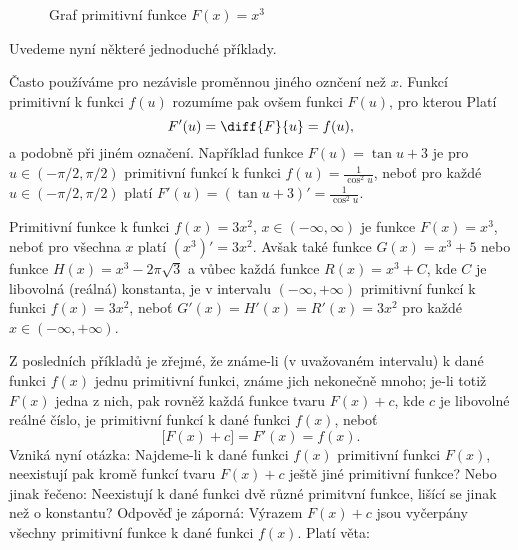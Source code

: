     \begin{figure}[ht!]
      \centering
      \caption{Graf primitivní funkce \(F(x) = x^3\)}
      \label{mai:fig099}
    \end{figure}

    Uvedeme nyní některé jednoduché příklady.
    

    Často používáme pro nezávisle proměnnou jiného oznčení než \(x\). Funkcí primitivní k funkci
    \(f(u)\) rozumíme pak ovšem funkci \(F(u)\), pro kterou Platí
    \begin{equation*}
      F'(u) = \diff{F}{u} = f(u),
    \end{equation*}
    a podobně při jiném označení. Například funkce \(F(u) = \tan u + 3\) je pro \(u\in(-\pi/2,
    \pi/2)\) primitivní funkcí k funkci \(f(u)=\frac{1}{\cos^2u}\), neboť pro každé \(u\in(-\pi/2,
    \pi/2)\) platí \(F'(u)=(\tan u + 3)' = \frac{1}{\cos^2u}\).

    Primitivní funkce k funkci \(f(x)=3x^2\), \(x\in(-\infty, \infty)\) je funkce \(F(x)=x^3\),
    neboť pro všechna \(x\) platí \((x^3)'=3x^2\). Avšak také funkce \(G(x) = x^3+5\) nebo funkce
    \(H(x)=x^3-2\pi\sqrt{3}\) a vůbec každá funkce \(R(x)=x^3+C\), kde \(C\) je libovolná (reálná)
    konstanta, je v intervalu \((-\infty, +\infty)\) primitivní funkcí k funkci \(f(x)=3x^2\), neboť
    \(G'(x)=H'(x)=R'(x)=3x^2\) pro každé \(x\in(-\infty, +\infty)\). 

    Z posledních příkladů je zřejmé, že známe-li (v uvažovaném intervalu) k dané funkci \(f(x)\)
    jednu primitivní funkci, známe jich nekonečně mnoho; je-li totiž \(F(x)\) jedna z nich, pak
    rovněž každá funkce tvaru \(F(x)+c\), kde \(c\) je libovolné reálné číslo, je primitivní funkcí
    k dané funkci \(f(x)\), neboť
    \begin{equation*}
      \bigl[F(x) + c\bigl] = F'(x) = f(x).
    \end{equation*}
    Vzniká nyní otázka: Najdeme-li k dané funkci \(f(x)\) primitivní funkci \(F(x)\), neexistují pak
    kromě funkcí tvaru \(F(x) + c\) ještě jiné primitivní funkce? Nebo jinak řečeno: Neexistují k
    dané funkci dvě různé primitvní funkce, lišící se jinak než o konstantu? Odpověď je záporná:
    Výrazem \(F(x) + c\) jsou vyčerpány všechny primitivní funkce k dané funkci \(f(x)\). Platí
    věta: 

